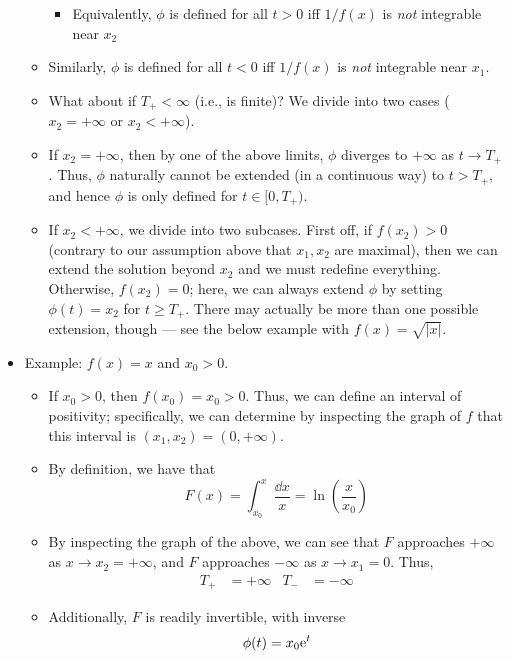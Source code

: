 \documentclass[../notes.tex]{subfiles}
\begin{document}
\begin{itemize}
\begin{itemize}
\begin{itemize}
            \item Equivalently, $\phi$ is defined for all $t>0$ iff $1/f(x)$ is \emph{not} integrable near $x_2$
        \end{itemize}
        \item Similarly, $\phi$ is defined for all $t<0$ iff $1/f(x)$ is \emph{not} integrable near $x_1$.
        \item What about if $T_+<\infty$ (i.e., is finite)? We divide into two cases ($x_2=+\infty$ or $x_2<+\infty$).
        \item If $x_2=+\infty$, then by one of the above limits, $\phi$ diverges to $+\infty$ as $t\to T_+$. Thus, $\phi$ naturally cannot be extended (in a continuous way) to $t>T_+$, and hence $\phi$ is only defined for $t\in[0,T_+)$.
        \item If $x_2<+\infty$, we divide into two subcases. First off, if $f(x_2)>0$ (contrary to our assumption above that $x_1,x_2$ are maximal), then we can extend the solution beyond $x_2$ and we must redefine everything. Otherwise, $f(x_2)=0$; here, we can always extend $\phi$ by setting $\phi(t)=x_2$ for $t\geq T_+$. There may actually be more than one possible extension, though --- see the below example with $f(x)=\sqrt{|x|}$.
    \end{itemize}
    \item Example: $f(x)=x$ and $x_0>0$.
    \begin{itemize}
        \item If $x_0>0$, then $f(x_0)=x_0>0$. Thus, we can define an interval of positivity; specifically, we can determine by inspecting the graph of $f$ that this interval is $(x_1,x_2)=(0,+\infty)$.
        \item By definition, we have that
        \begin{equation*}
            F(x) = \int_{x_0}^x\frac{\dd{x}}{x}
            = \ln(\frac{x}{x_0})
        \end{equation*}
        \item By inspecting the graph of the above, we can see that $F$ approaches $+\infty$ as $x\to x_2=+\infty$, and $F$ approaches $-\infty$ as $x\to x_1=0$. Thus,
        \begin{align*}
            T_+ &= +\infty&
            T_- &= -\infty
        \end{align*}
        \item Additionally, $F$ is readily invertible, with inverse
        \begin{equation*}
            \phi(t) = x_0\e[t]

\end{equation*}
\end{itemize}
\end{itemize}
\end{document}
